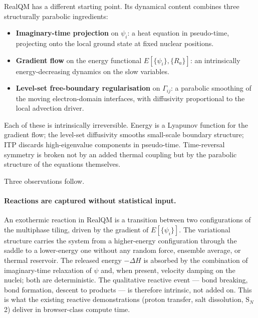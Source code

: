 \documentclass[11pt]{article}
\begin{document}
RealQM has a different starting point. Its dynamical content combines three structurally parabolic ingredients:

\begin{itemize}
\item \textbf{Imaginary-time projection} on $\psi_i$: a heat equation in pseudo-time, projecting onto the local ground state at fixed nuclear positions.
\item \textbf{Gradient flow} on the energy functional $E[\{\psi_i\}, \{R_a\}]$: an intrinsically energy-decreasing dynamics on the slow variables.
\item \textbf{Level-set free-boundary regularisation} on $\Gamma_{ij}$: a parabolic smoothing of the moving electron-domain interfaces, with diffusivity proportional to the local advection driver.
\end{itemize}

Each of these is intrinsically irreversible. Energy is a Lyapunov function for the gradient flow; the level-set diffusivity smooths small-scale boundary structure; ITP discards high-eigenvalue components in pseudo-time. Time-reversal symmetry is broken not by an added thermal coupling but by the parabolic structure of the equations themselves.

Three observations follow.

\paragraph{Reactions are captured without statistical input.}
An exothermic reaction in RealQM is a transition between two configurations of the multiphase tiling, driven by the gradient of $E[\{\psi_i\}]$. The variational structure carries the system from a higher-energy configuration through the saddle to a lower-energy one without any random force, ensemble average, or thermal reservoir. The released energy $-\Delta H$ is absorbed by the combination of imaginary-time relaxation of $\psi$ and, when present, velocity damping on the nuclei; both are deterministic. The qualitative reactive event --- bond breaking, bond formation, descent to products --- is therefore intrinsic, not added on. This is what the existing reactive demonstrations (proton transfer, salt dissolution, S$_N$2) deliver in browser-class compute time.
\end{document}
